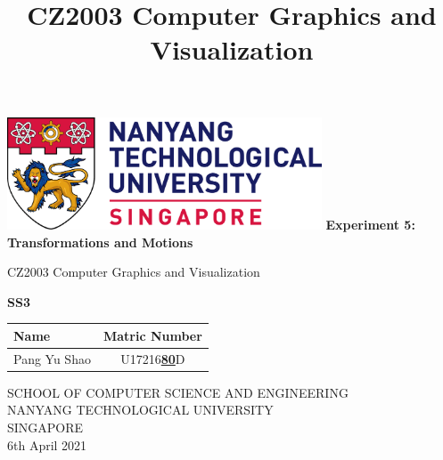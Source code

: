 \documentclass[acmlarge,nonacm=true]{acmart}
\begin{document}
	
	\begin{titlepage}
		\begin{center}
			\vspace*{1cm}
			\includegraphics[width=0.7\textwidth]{fig/ntu_logo}
			\vspace{0.8cm}
			\linebreak
			\Huge
			\textbf{Experiment 5: Transformations and Motions}
			
			\vspace{0.5cm}
			\LARGE
			CZ2003 Computer Graphics and Visualization
			
			\vspace{1.5cm}
			\textbf{SS3}\\
			
			\begin{table}[h]
				\begin{tabular}{lc}
					Name & Matric Number \\\hline
					Pang Yu Shao & U17216\underline{\textbf{80}}D \\
				\end{tabular}
			\end{table}
			
			
			
			\vfill
			
			\vspace{0.8cm}
			
			
			
			\Large
			SCHOOL OF COMPUTER SCIENCE AND ENGINEERING\\
			NANYANG TECHNOLOGICAL UNIVERSITY\\
			SINGAPORE\\
			6th April 2021
			
		\end{center}
	\end{titlepage}

 

\title{CZ2003 Computer Graphics and Visualization}

\end{document}
